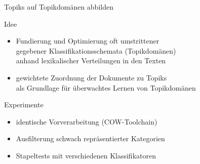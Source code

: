 \documentclass{beamer}
\begin{document}
\begin{frame}
  {Topiks auf Topikdomänen abbilden}
  
  Idee\\
  
  \begin{itemize}
    \item Fundierung und Optimierung oft umstrittener\\
      gegebener Klassifikationsschemata (Topikdomänen)\\
      anhand lexikalischer Verteilungen in den Texten
      \vspace{0.25cm}
    \item gewichtete Zuordnung der Dokumente zu Topiks\\
      als Grundlage für \alert{überwachtes Lernen von Topikdomänen}
  \end{itemize}

  Experimente\\
  
  \begin{itemize}
    \item identische Vorverarbeitung (COW-Toolchain)
    \item Ausfilterung schwach repräsentierter Kategorien
    \item Stapeltests mit verschiedenen Klassifikatoren
  \end{itemize}

\end{frame}

%
%
%
%
%
\end{document}
